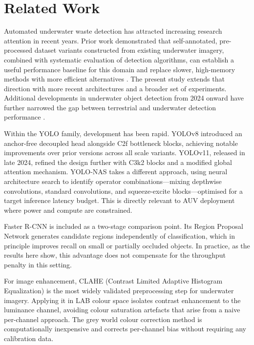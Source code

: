 \documentclass[conference]{IEEEtran}
\begin{document}

\section{Related Work}

Automated underwater waste detection has attracted increasing research
attention in recent years. Prior work demonstrated that self-annotated,
pre-processed dataset variants constructed from existing underwater imagery,
combined with systematic evaluation of detection algorithms, can establish a
useful performance baseline for this domain and replace slower, high-memory
methods with more efficient alternatives \cite{b1}. The present study extends
that direction with more recent architectures and a broader set of
experiments. Additional developments in underwater object detection from 2024
onward have further narrowed the gap between terrestrial and underwater
detection performance \cite{b2}.

Within the YOLO family, development has been rapid. YOLOv8 \cite{b4}
introduced an anchor-free decoupled head alongside C2f bottleneck blocks,
achieving notable improvements over prior versions across all scale variants.
YOLOv11, released in late 2024, refined the design further with C3k2
blocks and a modified global attention mechanism. YOLO-NAS \cite{b5} takes
a different approach, using neural architecture search to identify operator
combinations---mixing depthwise convolutions, standard convolutions, and
squeeze-excite blocks---optimised for a target inference latency budget. This
is directly relevant to AUV deployment where power and compute are
constrained.

Faster R-CNN is included as a two-stage comparison point. Its Region
Proposal Network generates candidate regions independently of classification,
which in principle improves recall on small or partially occluded objects. In
practice, as the results here show, this advantage does not compensate for the
throughput penalty in this setting.

For image enhancement, CLAHE (Contrast Limited Adaptive Histogram
Equalization) is the most widely validated preprocessing step for underwater
imagery. Applying it in LAB colour space isolates contrast enhancement to the
luminance channel, avoiding colour saturation artefacts that arise from a
naive per-channel approach. The grey world colour correction method is
computationally inexpensive and corrects per-channel bias without requiring
any calibration data.
\end{document}
